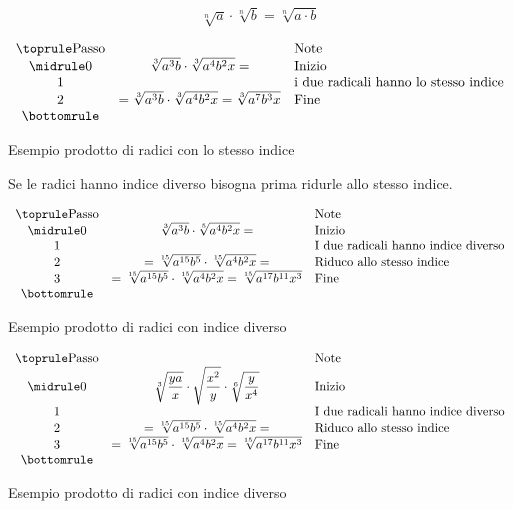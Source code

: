 \[\sqrt[n]{a}\cdot\sqrt[n]{b}=\sqrt[n]{a\cdot b}\]
\begin{table}[H]
\centering
$
\begin{array}{ccl}
\toprule
\text{Passo} &  & \text{Note} \\ 
\midrule
0 &\sqrt[3]{a^3b}\cdot\sqrt[3]{a^4b^2x}=  & \text{Inizio} \\ 
1 &  &  \text{i due radicali hanno lo stesso indice} \\ 
2 &=\sqrt[3]{a^3b}\cdot\sqrt[3]{a^4b^2x}=\sqrt[3]{a^7b^3x} & \text{Fine} \\ 
\bottomrule
\end{array} 
$
\label{Tab:radicprodotto1}
\caption{Esempio prodotto di radici con lo stesso indice}
\end{table}
Se le radici hanno indice diverso bisogna prima ridurle allo stesso indice.
\begin{table}[H]
\centering
$
\begin{array}{ccl}
\toprule
\text{Passo} &  & \text{Note} \\ 
\midrule
0 &\sqrt[3]{a^3b}\cdot\sqrt[5]{a^4b^2x}=  & \text{Inizio} \\ 
1 &  &   \text{I due radicali hanno indice diverso} \\ 
2 &=\sqrt[15]{a^{15}b^5}\cdot\sqrt[15]{a^4b^2x}= & \text{Riduco allo stesso indice} \\ 
3 &=\sqrt[15]{a^{15}b^5}\cdot\sqrt[15]{a^4b^2x}=\sqrt[15]{a^{17}b^{11}x^3} & \text{Fine} \\ 
\bottomrule
\end{array} 
$
\label{Tab:radiceprodotto2}
\caption{Esempio prodotto di radici con indice diverso}
\end{table}
\begin{table}[H]
\centering
$
\begin{array}{ccl}
\toprule
\text{Passo} &  & \text{Note} \\ 
\midrule
0 &\sqrt[3]{\dfrac{ya}{x}}\cdot\sqrt{\dfrac{x^2}{y}}\cdot\sqrt[6]{\dfrac{y}{x^4}}  & \text{Inizio} \\ 
1 &  &   \text{I due radicali hanno indice diverso} \\ 
2 &=\sqrt[15]{a^{15}b^5}\cdot\sqrt[15]{a^4b^2x}= & \text{Riduco allo stesso indice} \\ 
3 &=\sqrt[15]{a^{15}b^5}\cdot\sqrt[15]{a^4b^2x}=\sqrt[15]{a^{17}b^{11}x^3} & \text{Fine} \\ 
\bottomrule
\end{array} 
$
\label{Tab:radiceprodotto3}
\caption{Esempio prodotto di radici con indice diverso}
\end{table}
